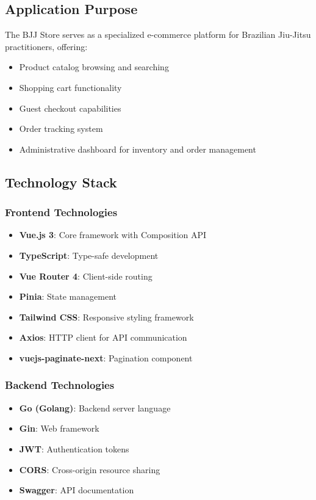 \documentclass[12pt,a4paper]{article}
\begin{document}
\subsection{Application Purpose}
The BJJ Store serves as a specialized e-commerce platform for Brazilian Jiu-Jitsu practitioners, offering:
\begin{itemize}
    \item Product catalog browsing and searching
    \item Shopping cart functionality
    \item Guest checkout capabilities
    \item Order tracking system
    \item Administrative dashboard for inventory and order management
\end{itemize}

\subsection{Technology Stack}

\subsubsection{Frontend Technologies}
\begin{itemize}
    \item \textbf{Vue.js 3}: Core framework with Composition API
    \item \textbf{TypeScript}: Type-safe development
    \item \textbf{Vue Router 4}: Client-side routing
    \item \textbf{Pinia}: State management
    \item \textbf{Tailwind CSS}: Responsive styling framework
    \item \textbf{Axios}: HTTP client for API communication
    \item \textbf{vuejs-paginate-next}: Pagination component
\end{itemize}

\subsubsection{Backend Technologies}
\begin{itemize}
    \item \textbf{Go (Golang)}: Backend server language
    \item \textbf{Gin}: Web framework
    \item \textbf{JWT}: Authentication tokens
    \item \textbf{CORS}: Cross-origin resource sharing
    \item \textbf{Swagger}: API documentation
\end{itemize}
\end{document}
